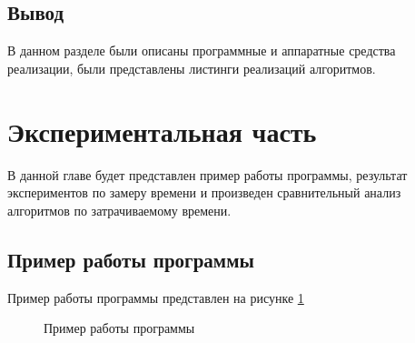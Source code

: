 \documentclass{article}
\begin{document}
	\subsection{Вывод}
	В данном разделе были описаны программные и аппаратные средства реализации, были представлены листинги реализаций алгоритмов.

	\newpage
	\section{Экспериментальная часть}
	В данной главе будет представлен пример работы программы, результат экспериментов по замеру времени и произведен сравнительный анализ алгоритмов по затрачиваемому времени.
	\subsection{Пример работы программы}
	Пример работы программы представлен на рисунке \hyperref[programmWork]{\ref{programmWork}}
	 	\begin{figure}[h!]
		 	\caption{Пример работы программы}
		 	\label{programmWork}
	 	\end{figure}
	
\end{document}
